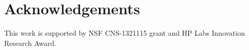 \section{Acknowledgements}
This work is supported by NSF CNS-1321115 grant and HP Labs Innovation Research Award.